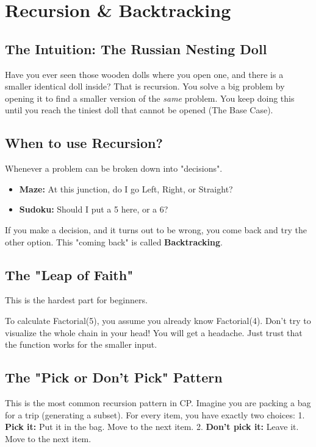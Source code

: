 \documentclass[12pt, a4paper]{report}
\begin{document}
\chapter{Recursion \& Backtracking}
\section{The Intuition: The Russian Nesting Doll}
Have you ever seen those wooden dolls where you open one, and there is a smaller identical doll inside? That is recursion.
You solve a big problem by opening it to find a smaller version of the \textit{same} problem. You keep doing this until you reach the tiniest doll that cannot be opened (The Base Case).

\section{When to use Recursion?}
Whenever a problem can be broken down into "decisions".
\begin{itemize}
    \item \textbf{Maze:} At this junction, do I go Left, Right, or Straight?
    \item \textbf{Sudoku:} Should I put a 5 here, or a 6?
\end{itemize}
If you make a decision, and it turns out to be wrong, you come back and try the other option. This "coming back" is called \textbf{Backtracking}.

\section{The "Leap of Faith"}
This is the hardest part for beginners.
\begin{thinkbox}
To calculate Factorial(5), you assume you already know Factorial(4). Don't try to visualize the whole chain in your head! You will get a headache. Just trust that the function works for the smaller input.
\end{thinkbox}

\section{The "Pick or Don't Pick" Pattern}
This is the most common recursion pattern in CP.
Imagine you are packing a bag for a trip (generating a subset). For every item, you have exactly two choices:
1. \textbf{Pick it:} Put it in the bag. Move to the next item.
2. \textbf{Don't pick it:} Leave it. Move to the next item.
\end{document}
